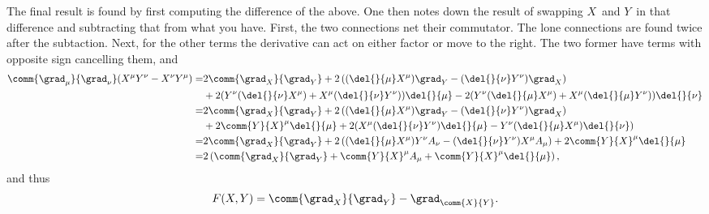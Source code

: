 The final result is found by first computing the difference of the above. One then notes down the result of swapping $X$ and $Y$ in that difference and subtracting that from what you have. First, the two connections net their commutator. The lone connections are found twice after the subtaction. Next, for the other terms the derivative can act on either factor or move to the right. The two former have terms with opposite sign cancelling them, and
\begin{align*}
	\comm{\grad_{\mu}}{\grad_{\nu}}(X^{\mu}Y^{\nu} - X^{\nu}Y^{\mu}) =& 2\comm{\grad_{X}}{\grad_{Y}} + 2\left((\del{}{\mu}X^{\mu})\grad_{Y} - (\del{}{\nu}Y^{\nu})\grad_{X}\right) \\
	&+ 2(Y^{\nu}(\del{}{\nu}X^{\mu}) + X^{\mu}(\del{}{\nu}Y^{\nu}))\del{}{\mu} - 2(Y^{\nu}(\del{}{\mu}X^{\mu}) + X^{\mu}(\del{}{\mu}Y^{\nu}))\del{}{\nu} \\
	=& 2\comm{\grad_{X}}{\grad_{Y}} + 2\left((\del{}{\mu}X^{\mu})\grad_{Y} - (\del{}{\nu}Y^{\nu})\grad_{X}\right) \\
	&+ 2\comm{Y}{X}^{\mu}\del{}{\mu} + 2(X^{\mu}(\del{}{\nu}Y^{\nu})\del{}{\mu} - Y^{\nu}(\del{}{\mu}X^{\mu})\del{}{\nu}) \\
	=& 2\comm{\grad_{X}}{\grad_{Y}} + 2\left((\del{}{\mu}X^{\mu})Y^{\nu}A_{\nu} - (\del{}{\nu}Y^{\nu})X^{\mu}A_{\mu}\right) + 2\comm{Y}{X}^{\mu}\del{}{\mu} \\
	=& 2\left(\comm{\grad_{X}}{\grad_{Y}} + \comm{Y}{X}^{\mu}A_{\mu} + \comm{Y}{X}^{\mu}\del{}{\mu}\right),
\end{align*}
and thus
\begin{align*}
	F(X, Y) = \comm{\grad_{X}}{\grad_{Y}} - \grad_{\comm{X}{Y}}.
\end{align*}

